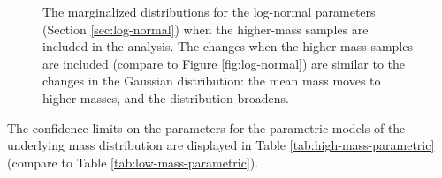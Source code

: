 \documentclass[preprint]{aastex}
\begin{document}
\begin{figure}
  \begin{center}
  \end{center}
  \caption{\label{fig:log-normal-high} The marginalized distributions
    for the log-normal parameters (Section \ref{sec:log-normal}) when
    the higher-mass samples are included in the analysis.  The changes
    when the higher-mass samples are included (compare to Figure
    \ref{fig:log-normal}) are similar to the changes in the Gaussian
    distribution: the mean mass moves to higher masses, and the
    distribution broadens.}
\end{figure}

The confidence limits on the parameters for the parametric models of
the underlying mass distribution are displayed in Table
\ref{tab:high-mass-parametric} (compare to Table
\ref{tab:low-mass-parametric}).
\end{document}
